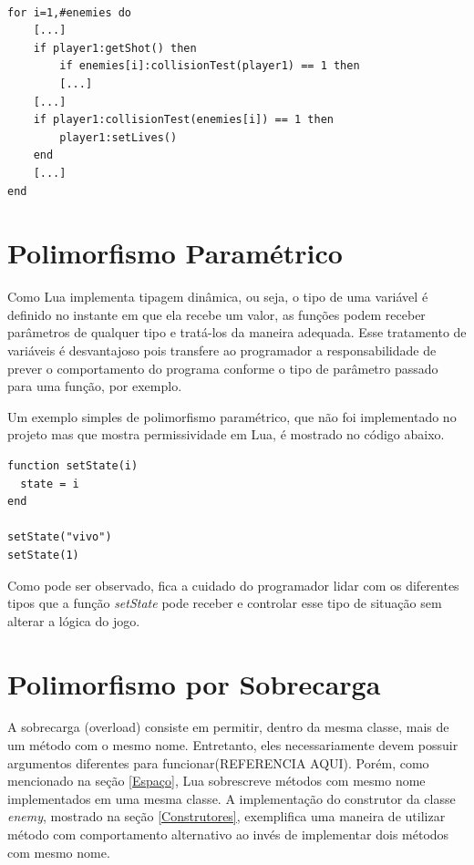 \documentclass[rel_mlp]{iiufrgs}
\begin{document}
\begin{lstlisting}

for i=1,#enemies do
    [...]
	if player1:getShot() then
    	if enemies[i]:collisionTest(player1) == 1 then
       	[...]
    [...]
    if player1:collisionTest(enemies[i]) == 1 then
    	player1:setLives()
    end
    [...]
end

\end{lstlisting}


\section{Polimorfismo Paramétrico}

Como Lua implementa tipagem dinâmica, ou seja, o tipo de uma variável é definido no instante em que ela recebe um valor, as funções podem receber parâmetros de qualquer tipo e tratá-los da maneira adequada. Esse tratamento de variáveis é desvantajoso pois transfere ao programador a responsabilidade de prever o comportamento do programa conforme o tipo de parâmetro passado para uma função, por exemplo. 

Um exemplo simples de polimorfismo paramétrico, que não foi implementado no projeto mas que mostra permissividade em Lua, é mostrado no código abaixo. 

\begin{lstlisting}
function setState(i)
  state = i
end

setState("vivo")
setState(1)
\end{lstlisting}

Como pode ser observado, fica a cuidado do programador lidar com os diferentes tipos que a função \textit{setState} pode receber e controlar esse tipo de situação sem alterar a lógica do jogo.

\section{Polimorfismo por Sobrecarga}

A sobrecarga (overload) consiste em permitir, dentro da mesma classe, mais de um método com o mesmo nome. Entretanto, eles necessariamente devem possuir argumentos diferentes para funcionar(REFERENCIA AQUI). Porém, como mencionado na seção \ref{Espaço}, Lua sobrescreve métodos com mesmo nome implementados em uma mesma classe. A implementação do construtor da classe \textit{enemy}, mostrado na seção \ref{Construtores}, exemplifica uma maneira de utilizar método com comportamento alternativo ao invés de implementar dois métodos com mesmo nome.
\end{document}
